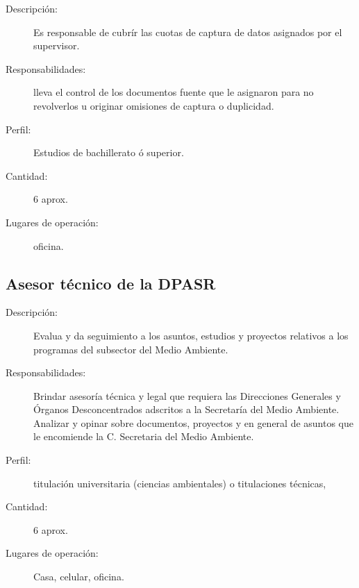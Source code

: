 \begin{description}
	\item[Descripción: ] Es responsable de cubrír las cuotas de captura de datos asignados por el supervisor.
	\item[Responsabilidades: ]lleva el control de los documentos fuente que le asignaron para no revolverlos u originar omisiones de captura o duplicidad.
	\item[Perfil: ]  Estudios de bachillerato ó superior.
 
	\item[Cantidad: ] 6 aprox. 
	\item[Lugares de operación: ]  oficina.
\end{description}

\subsection{Asesor técnico de la DPASR}

\begin{description}
	\item[Descripción: ] Evalua y da seguimiento a los asuntos, estudios y proyectos relativos a los programas del subsector del Medio Ambiente.
	\item[Responsabilidades: ]Brindar asesoría técnica y legal que requiera  las Direcciones Generales y Órganos Desconcentrados adscritos a la Secretaría del Medio Ambiente. Analizar y opinar sobre documentos, proyectos y en general de asuntos que le encomiende la C. Secretaria del Medio Ambiente. 
	\item[Perfil: ] titulación universitaria (ciencias ambientales) o titulaciones técnicas,
	\item[Cantidad: ] 6 aprox. 
	\item[Lugares de operación: ] Casa, celular, oficina.
\end{description}